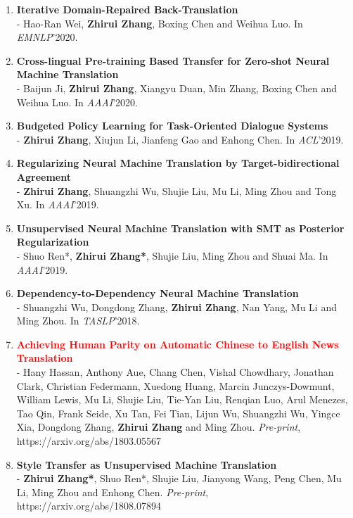 \documentclass{resume}
\begin{document}
\begin{enumerate}
\item \normalsize \textbf{Iterative Domain-Repaired Back-Translation} \\
\small - Hao-Ran Wei, \textbf{Zhirui Zhang}, Boxing Chen and Weihua Luo. In \textit{EMNLP}'2020.

\item \normalsize \textbf{Cross-lingual Pre-training Based Transfer for Zero-shot Neural Machine Translation} \\
\small - Baijun Ji, \textbf{Zhirui Zhang}, Xiangyu Duan, Min Zhang, Boxing Chen and Weihua Luo. In \textit{AAAI}'2020.

\item \normalsize \textbf{Budgeted Policy Learning for Task-Oriented Dialogue Systems} \\
\small - \textbf{Zhirui Zhang}, Xiujun Li, Jianfeng Gao and Enhong Chen. In \textit{ACL}'2019.

\item \normalsize \textbf{Regularizing Neural Machine Translation by Target-bidirectional Agreement} \\
\small - \textbf{Zhirui Zhang}, Shuangzhi Wu, Shujie Liu, Mu Li, Ming Zhou and Tong Xu. In \textit{AAAI}'2019.

\item \normalsize \textbf{Unsupervised Neural Machine Translation with SMT as Posterior Regularization} \\
\small - Shuo Ren*, \textbf{Zhirui Zhang*}, Shujie Liu, Ming Zhou and Shuai Ma. In \textit{AAAI}'2019.

\item \normalsize \textbf{Dependency-to-Dependency Neural Machine Translation} \\
\small - Shuangzhi Wu, Dongdong Zhang, \textbf{Zhirui Zhang}, Nan Yang, Mu Li and Ming Zhou. In \textit{TASLP}'2018.

\item \normalsize \textcolor{red}{\textbf{Achieving Human Parity on Automatic Chinese to English News Translation}} \\
\small - Hany Hassan, Anthony Aue, Chang Chen, Vishal Chowdhary, Jonathan Clark, Christian Federmann, Xuedong Huang, Marcin Junczys-Dowmunt, William Lewis, Mu Li, Shujie Liu, Tie-Yan Liu, Renqian Luo, Arul Menezes, Tao Qin, Frank Seide, Xu Tan, Fei Tian, Lijun Wu, Shuangzhi Wu, Yingce Xia, Dongdong Zhang, \textbf{Zhirui Zhang} and Ming Zhou. \textit{Pre-print}, https://arxiv.org/abs/1803.05567 

\item \normalsize \textbf{Style Transfer as Unsupervised Machine Translation} \\
\small - \textbf{Zhirui Zhang*}, Shuo Ren*, Shujie Liu, Jianyong Wang, Peng Chen, Mu Li, Ming Zhou and Enhong Chen. \textit{Pre-print}, https://arxiv.org/abs/1808.07894


\end{enumerate}
\end{document}
